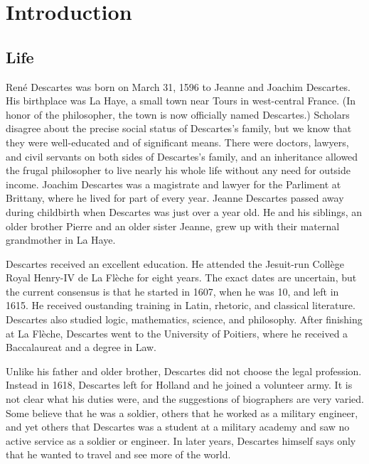 \chapter{Introduction}

\section*{Life}

René Descartes was born on March 31, 1596 to Jeanne and Joachim Descartes. His birthplace was La Haye, a small town near Tours in west-central France. (In honor of the philosopher, the town is now officially named Descartes.) Scholars disagree about the precise social status of Descartes's family, but we know that they were well-educated and of significant means. There were doctors, lawyers, and civil servants on both sides of Descartes's family, and an inheritance allowed the frugal philosopher to live nearly his whole life without any need for outside income. Joachim Descartes was a magistrate and lawyer for the Parliment at Brittany, where he lived for part of every year. Jeanne Descartes passed away during childbirth when Descartes was just over a year old. He and his siblings, an older brother Pierre and an older sister Jeanne, grew up with their maternal grandmother in La Haye.

Descartes received an excellent education. He attended the Jesuit-run Collège Royal Henry-IV de La Flèche for eight years. The exact dates are uncertain, but the current consensus is that he started in 1607, when he was 10, and left in 1615. He received oustanding training in Latin, rhetoric, and classical literature. Descartes also studied logic, mathematics, science, and philosophy. After finishing at La Flèche, Descartes went to the University of Poitiers, where he received a Baccalaureat and a degree in Law.

Unlike his father and older brother, Descartes did not choose the legal profession. Instead in 1618, Descartes left for Holland and he joined a volunteer army. It is not clear what his duties were, and the suggestions of biographers are very varied. Some believe that he was a soldier, others that he worked as a military engineer, and yet others that Descartes was a student at a military academy and saw no active service as a soldier or engineer. In later years, Descartes himself says only that he wanted to travel and see more of the world.

